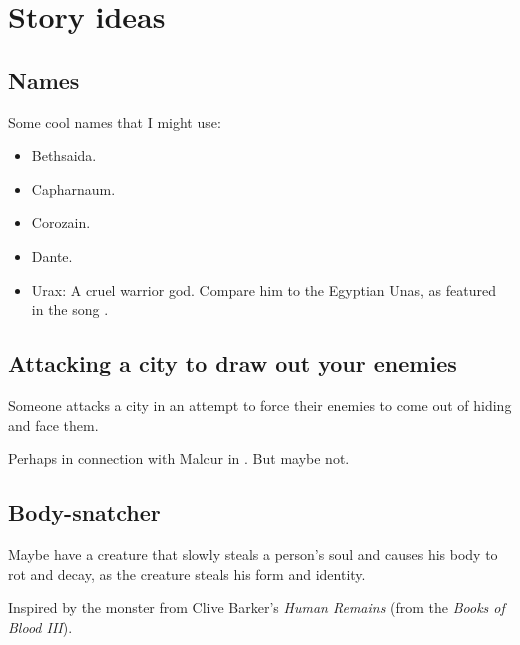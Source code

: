 \chapter{Story ideas}
\section{Names}
Some cool names that I might use:

\begin{itemize}
  \item Bethsaida.
  \item Capharnaum.
  \item Corozain.
  \item Dante.
  \item Urax: A cruel warrior god. Compare him to the Egyptian Unas, as featured in the song . 
\end{itemize}















\section{Attacking a city to draw out your enemies}
Someone attacks a city in an attempt to force their enemies to come out of hiding and face them. 

Perhaps in connection with Malcur in \emph{\RungerWarBook}. But maybe not. 















\section{Body-snatcher}
Maybe have a creature that slowly steals a person's soul and causes his body to rot and decay, as the creature steals his form and identity. 

Inspired by the monster from Clive Barker's \emph{Human Remains} (from the \emph{Books of Blood III}). 















